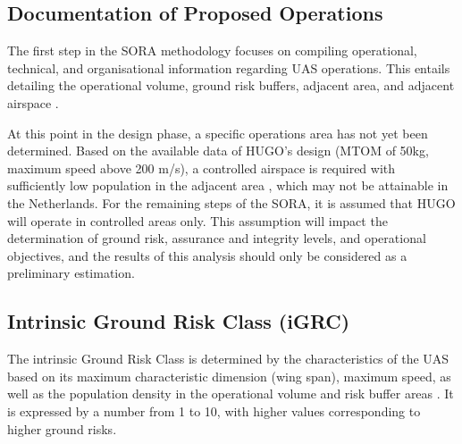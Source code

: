 \subsection{Documentation of Proposed Operations}
The first step in the SORA methodology focuses on compiling operational, technical, and organisational information regarding UAS operations. This entails detailing the operational volume, ground risk buffers, adjacent area, and adjacent airspace \cite{Jarus_main}\cite{Jarus_Annex_A}.

At this point in the design phase, a specific operations area has not yet been determined. Based on the available data of HUGO's design (MTOM of 50kg, maximum speed above 200 m/s), a controlled airspace is required with sufficiently low population in the adjacent area \cite{Jarus_main}, which may not be attainable in the Netherlands. For the remaining steps of the SORA, it is assumed that HUGO will operate in controlled areas only. This assumption will impact the determination of ground risk, assurance and integrity levels, and operational objectives, and the results of this analysis should only be considered as a preliminary estimation.


\subsection{Intrinsic Ground Risk Class (iGRC)}
The intrinsic Ground Risk Class is determined by the characteristics of the UAS based on its maximum characteristic dimension (wing span), maximum speed, as well as the population density in the operational volume and risk buffer areas \cite{Jarus_main}. It is expressed by a number from 1 to 10, with higher values corresponding to higher ground risks.

